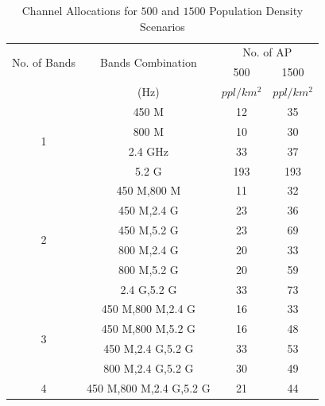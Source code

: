  \begin{table}[h]
 \centering
 \begin{tabular}{|c|c|c|c|}
 \hline
 \multirow{2}{*}{No. of Bands} & \multirow{2}{*}{Bands Combination} & \multicolumn{2}{c|}{No. of AP} \\
 \cline{3-4}
  &  & 500 & 1500 \\
 & (Hz) & $ppl/km^2$ &  $ppl/km^2$ \\
 \hline
 \multirow{4}{*}{1}    & 450 M  & 12  & 35 \\
 \cline{2-4}
                              & 800 M & 10  &  30 \\
 \cline{2-4}
			      & 2.4 GHz & 33  &  37 \\
 \cline{2-4}
                              & 5.2 G & 193 &  193 \\ 
 \hline
 \multirow{6}{*}{2}   & 450 M,800 M & 11  & 32\\
 \cline{2-4}
                              & 450 M,2.4 G & 23  & 36\\
 \cline{2-4}
			      & 450 M,5.2 G & 23  & 69\\
 \cline{2-4}
			      & 800 M,2.4 G & 20  & 33\\ 
 \cline{2-4}
			      & 800 M,5.2 G & 20  & 59\\ 
 \cline{2-4}
			      & 2.4 G,5.2 G & 33  & 73\\ 
 \hline
 \multirow{4}{*}{3} & 450 M,800 M,2.4 G & 16  & 33\\
 \cline{2-4}
                              & 450 M,800 M,5.2 G & 16  & 48\\
 \cline{2-4}
			      & 450 M,2.4 G,5.2 G & 33  & 53\\
 \cline{2-4}
			      & 800 M,2.4 G,5.2 G & 30 &  49\\ 
 \hline
 4  & 450 M,800 M,2.4 G,5.2 G & 21  & 44 \\
 \hline
 \end{tabular}
 \caption{Channel Allocations for $500$ and $1500$ Population Density Scenarios}
 \label{tab:500comb}
 \vspace{-0.4in}
 \end{table}


